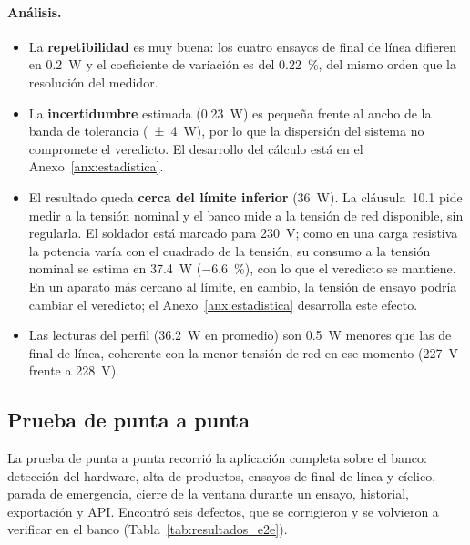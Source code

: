 \paragraph{Análisis.}
\begin{itemize}
    \item La \textbf{repetibilidad} es muy buena: los cuatro ensayos de final de
          línea difieren en \SI{0,2}{\watt} y el coeficiente de variación es del
          \SI{0,22}{\percent}, del mismo orden que la resolución del medidor.
    \item La \textbf{incertidumbre} estimada (\SI{0,23}{\watt}) es pequeña frente
          al ancho de la banda de tolerancia (\SI{\pm 4}{\watt}), por lo que la
          dispersión del sistema no compromete el veredicto. El desarrollo del
          cálculo está en el Anexo~\ref{anx:estadistica}.
    \item El resultado queda \textbf{cerca del límite inferior} (\SI{36}{\watt}).
          La cláusula~10.1 pide medir a la tensión nominal y el banco mide a la
          tensión de red disponible, sin regularla. El soldador está marcado para
          \SI{230}{\volt}; como en una carga resistiva la potencia varía con el
          cuadrado de la tensión, su consumo a la tensión nominal se estima en
          \SI{37,4}{\watt} (\SI{-6,6}{\percent}), con lo que el veredicto se
          mantiene. En un aparato más cercano al límite, en cambio, la tensión de
          ensayo podría cambiar el veredicto; el Anexo~\ref{anx:estadistica}
          desarrolla este efecto.
    \item Las lecturas del perfil (\SI{36,2}{\watt} en promedio) son
          \SI{0,5}{\watt} menores que las de final de línea, coherente con la
          menor tensión de red en ese momento (\SI{227}{\volt} frente a
          \SI{228}{\volt}).
\end{itemize}

\subsection{Prueba de punta a punta}
\label{subsec:resultados_e2e}

La prueba de punta a punta recorrió la aplicación completa sobre el
banco: detección del hardware, alta de productos, ensayos de final de línea y
cíclico, parada de emergencia, cierre de la ventana durante un ensayo, historial,
exportación y API. Encontró seis defectos, que se corrigieron y se volvieron a
verificar en el banco (Tabla~\ref{tab:resultados_e2e}).

